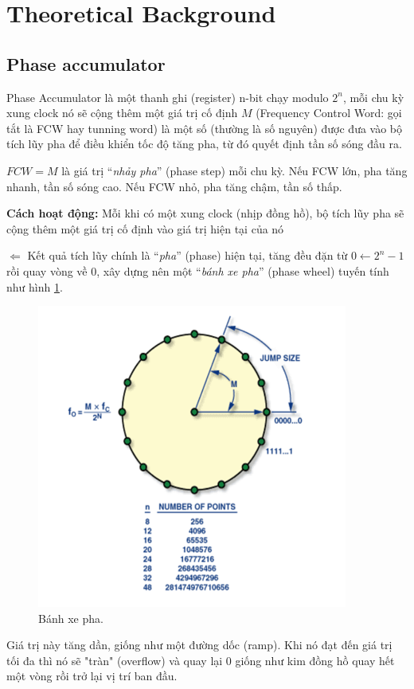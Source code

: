 \section{Theoretical Background}
\subsection{Phase accumulator}

Phase Accumulator là một thanh ghi (register) n-bit chạy modulo $ 2^{n} $, mỗi chu kỳ xung clock nó sẽ cộng thêm một giá trị cố định $M$ (Frequency Control Word: gọi tắt là FCW hay tunning word) là một số (thường là số nguyên) được đưa vào bộ tích lũy pha để điều khiển tốc độ tăng pha, từ đó quyết định tần số sóng đầu ra.

$ FCW = M $ là giá trị “\textit{nhảy pha}” (phase step) mỗi chu kỳ. Nếu FCW lớn, pha tăng nhanh, tần số sóng cao. Nếu FCW nhỏ, pha tăng chậm, tần số thấp.
 
\textbf{Cách hoạt động:} Mỗi khi có một xung clock (nhịp đồng hồ), bộ tích lũy pha sẽ cộng thêm một giá trị cố định vào giá trị hiện tại của nó

$ \Leftarrow $ Kết quả tích lũy chính là “\textit{pha}” (phase) hiện tại, tăng đều đặn từ $ 0 \leftarrow 2^{n} - 1 $ rồi quay vòng về $ 0 $, xây dựng nên một “\textit{bánh xe pha}” (phase wheel) tuyến tính như hình \ref{fig: banh xe pha}.

\begin{figure}[H]
	\centering
	\includegraphics[width=.6\linewidth]{./my-chapters/my-images/Gen_wave/hinh1.png}
	\caption{Bánh xe pha.}
	\label{fig: banh xe pha}
\end{figure}

Giá trị này tăng dần, giống như một đường dốc (ramp). Khi nó đạt đến giá trị tối đa thì nó sẽ "tràn" (overflow) và quay lại 0 giống như kim đồng hồ quay hết một vòng rồi trở lại vị trí ban đầu.

